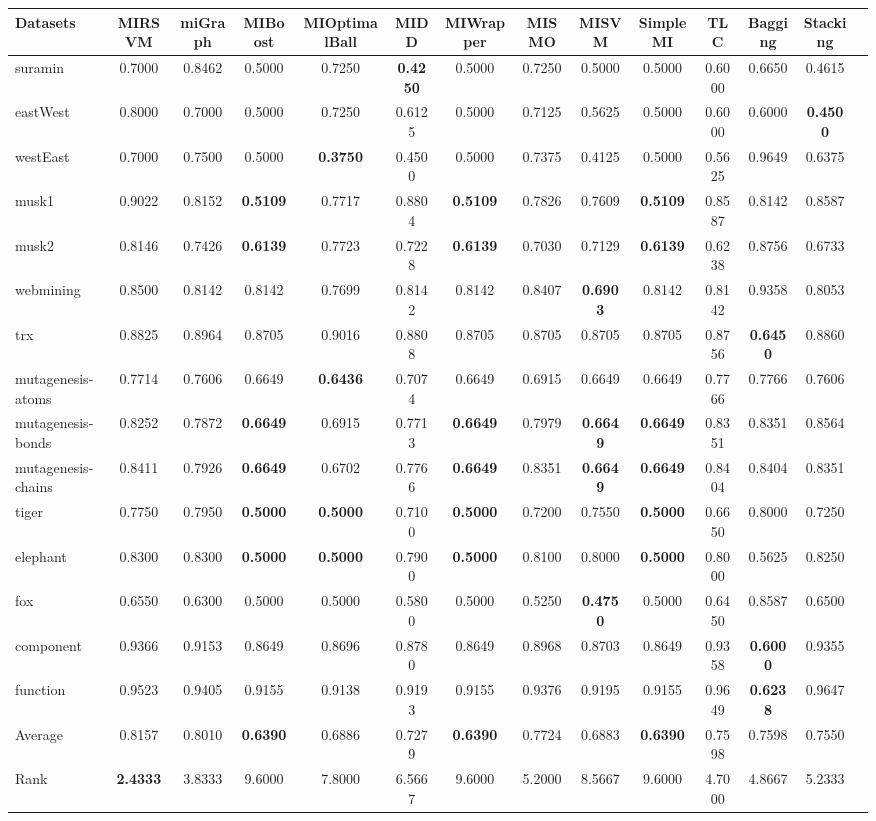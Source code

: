 \begin{threeparttable}
\begin{tabular}{lccccccccccccc}
\toprule
Datasets &MIRSVM &miGraph &MIBoost &MIOptimalBall &MIDD &MIWrapper &MISMO &MISVM &SimpleMI &TLC &Bagging &Stacking \\
\midrule
suramin &0.7000 &0.8462 &0.5000 &0.7250 &\textbf{0.4250} &0.5000 &0.7250 &0.5000 &0.5000 &0.6000 &0.6650 &0.4615 &  \\
eastWest &0.8000 &0.7000 &0.5000 &0.7250 &0.6125 &0.5000 &0.7125 &0.5625 &0.5000 &0.6000 &0.6000 &\textbf{0.4500} &  \\
westEast &0.7000 &0.7500 &0.5000 &\textbf{0.3750} &0.4500 &0.5000 &0.7375 &0.4125 &0.5000 &0.5625 &0.9649 &0.6375 &  \\
musk1 &0.9022 &0.8152 &\textbf{0.5109} &0.7717 &0.8804 &\textbf{0.5109} &0.7826 &0.7609 &\textbf{0.5109} &0.8587 &0.8142 &0.8587 &  \\
musk2 &0.8146 &0.7426 &\textbf{0.6139} &0.7723 &0.7228 &\textbf{0.6139} &0.7030 &0.7129 &\textbf{0.6139} &0.6238 &0.8756 &0.6733 &  \\
webmining &0.8500 &0.8142 &0.8142 &0.7699 &0.8142 &0.8142 &0.8407 &\textbf{0.6903} &0.8142 &0.8142 &0.9358 &0.8053 &  \\
trx &0.8825 &0.8964 &0.8705 &0.9016 &0.8808 &0.8705 &0.8705 &0.8705 &0.8705 &0.8756 &\textbf{0.6450} &0.8860 &  \\
mutagenesis-atoms &0.7714 &0.7606 &0.6649 &\textbf{0.6436} &0.7074 &0.6649 &0.6915 &0.6649 &0.6649 &0.7766 &0.7766 &0.7606 &  \\
mutagenesis-bonds &0.8252 &0.7872 &\textbf{0.6649} &0.6915 &0.7713 &\textbf{0.6649} &0.7979 &\textbf{0.6649} &\textbf{0.6649} &0.8351 &0.8351 &0.8564 &  \\
mutagenesis-chains &0.8411 &0.7926 &\textbf{0.6649} &0.6702 &0.7766 &\textbf{0.6649} &0.8351 &\textbf{0.6649} &\textbf{0.6649} &0.8404 &0.8404 &0.8351 &  \\
tiger &0.7750 &0.7950 &\textbf{0.5000} &\textbf{0.5000} &0.7100 &\textbf{0.5000} &0.7200 &0.7550 &\textbf{0.5000} &0.6650 &0.8000 &0.7250 &  \\
elephant &0.8300 &0.8300 &\textbf{0.5000} &\textbf{0.5000} &0.7900 &\textbf{0.5000} &0.8100 &0.8000 &\textbf{0.5000} &0.8000 &0.5625 &0.8250 &  \\
fox &0.6550 &0.6300 &0.5000 &0.5000 &0.5800 &0.5000 &0.5250 &\textbf{0.4750} &0.5000 &0.6450 &0.8587 &0.6500 &  \\
component &0.9366 &0.9153 &0.8649 &0.8696 &0.8780 &0.8649 &0.8968 &0.8703 &0.8649 &0.9358 &\textbf{0.6000} &0.9355 &  \\
function &0.9523 &0.9405 &0.9155 &0.9138 &0.9193 &0.9155 &0.9376 &0.9195 &0.9155 &0.9649 &\textbf{0.6238} &0.9647 &  \\
\hline
Average &0.8157 &0.8010 &\textbf{0.6390} &0.6886 &0.7279 &\textbf{0.6390} &0.7724 &0.6883 &\textbf{0.6390} &0.7598 &0.7598 &0.7550 &  \\
Rank &\textbf{2.4333} &3.8333 &9.6000 &7.8000 &6.5667 &9.6000 &5.2000 &8.5667 &9.6000 &4.7000 &4.8667 &5.2333 &  \\
\bottomrule
\end{tabular}
\end{threeparttable}